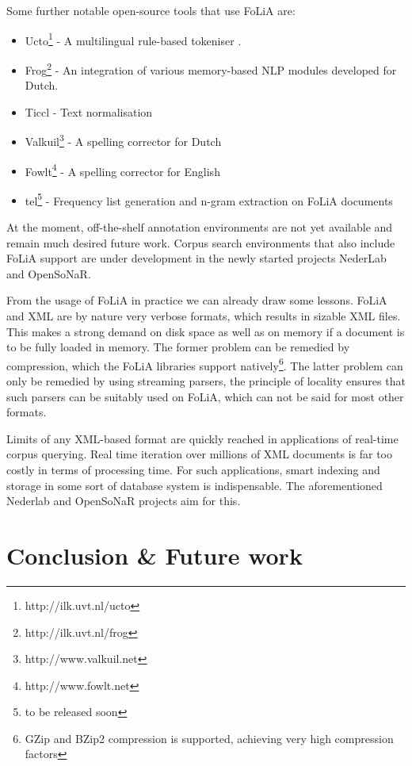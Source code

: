 \documentclass[a4paper,10pt,twoside]{article}
\begin{document}
Some further notable open-source tools that use FoLiA are:

\begin{itemize}
  \item Ucto\footnote{http://ilk.uvt.nl/ucto} - A multilingual rule-based
    tokeniser \cite{UCTO}.
 \item Frog\footnote{http://ilk.uvt.nl/frog} - An integration of various memory-based NLP modules developed for
  Dutch. 
 \item Ticcl - Text normalisation  %
 \item Valkuil\footnote{http://www.valkuil.net} - A spelling corrector for Dutch
 \item Fowlt\footnote{http://www.fowlt.net} - A spelling corrector for English
 \item tel\footnote{to be released soon} - Frequency list generation and n-gram
   extraction on FoLiA documents
\end{itemize}

At the moment, off-the-shelf annotation environments are not yet available and
remain much desired future work. Corpus search environments that also include
FoLiA support are under development in the newly started projects NederLab and
OpenSoNaR. %

From the usage of FoLiA in practice we can already draw some lessons. FoLiA and
XML are by nature very verbose formats, which results in sizable XML files.
This makes a strong demand on disk space as well as on memory if a document is
to be fully loaded in memory. The former problem can be remedied by
compression, which the FoLiA libraries support natively\footnote{GZip and BZip2
compression is supported, achieving very high compression factors}. The latter
problem can only be remedied by using streaming parsers, the principle of
locality ensures that such parsers can be suitably used on FoLiA, which can not
be said for most other formats.

Limits of any XML-based format are quickly reached in applications of real-time corpus
querying. Real time iteration over millions of XML documents is far too costly in terms
of processing time. For such applications, smart indexing and storage in some sort of
database system is indispensable. The aforementioned Nederlab and OpenSoNaR
projects aim for this. 

\section{Conclusion \& Future work}
\end{document}
